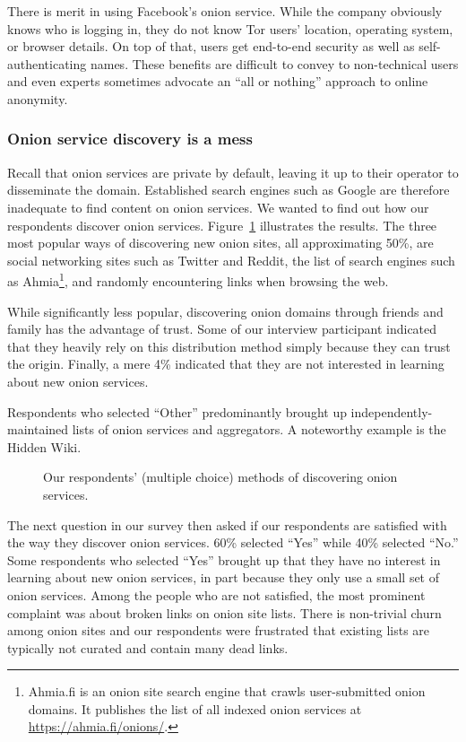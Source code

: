 There is merit in using Facebook's onion service.  While the company obviously
knows who is logging in, they do not know Tor users' location, operating system,
or browser details.  On top of that, users get end-to-end security as well as
self-authenticating names.  These benefits are difficult to convey to
non-technical users and even experts sometimes advocate an ``all or nothing''
approach to online anonymity.

\subsubsection{Onion service discovery is a mess}

Recall that onion services are private by default, leaving it up to their
operator to disseminate the domain.  Established search engines such as Google
are therefore inadequate to find content on onion services.  We wanted to find
out how our respondents discover onion services.
Figure~\ref{fig:onion-discovery} illustrates the results.  The three most
popular ways of discovering new onion sites, all approximating 50\%, are social
networking sites such as Twitter and Reddit, the list of search engines such as
Ahmia\footnote{Ahmia.fi is an onion site search engine that crawls
user-submitted onion domains.  It publishes the list of all indexed onion
services at \url{https://ahmia.fi/onions/}.}, and randomly encountering links
when browsing the web.

While significantly less popular, discovering onion domains through friends and
family has the advantage of trust.  Some of our interview participant indicated
that they heavily rely on this distribution method simply because they can trust
the origin.  Finally, a mere 4\% indicated that they are not interested in
learning about new onion services.

Respondents who selected ``Other'' predominantly brought up
independently-maintained lists of onion services and aggregators.  A noteworthy
example is the Hidden Wiki.

\begin{figure}[t]
    \centering
    
    \caption{Our respondents' (multiple choice) methods of discovering onion
    services.}
    \label{fig:onion-discovery}
\end{figure}

The next question in our survey then asked if our respondents are satisfied with
the way they discover onion services.  60\% selected ``Yes'' while 40\% selected
``No.'' Some respondents who selected ``Yes'' brought up that they have no
interest in learning about new onion services, in part because they only use a
small set of onion services.  Among the people who are not satisfied, the most
prominent complaint was about broken links on onion site lists.  There is
non-trivial churn among onion sites and our respondents were frustrated that
existing lists are typically not curated and contain many dead links.

